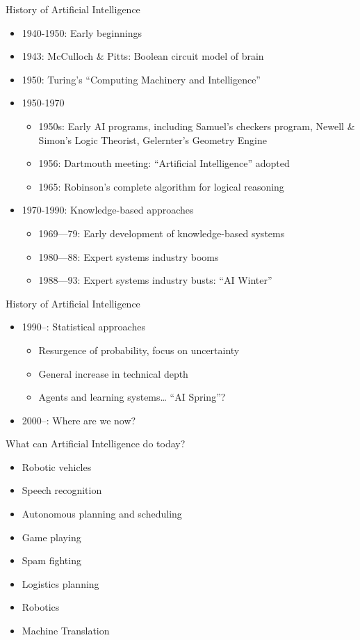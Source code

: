 \documentclass{beamer}
\begin{document}
\begin{frame}{History of Artificial Intelligence}
\begin{itemize}
    \item 1940-1950: Early beginnings
    \item 1943: McCulloch & Pitts: Boolean circuit model of brain
    \item 1950: Turing's “Computing Machinery and Intelligence”
    \item 1950-1970
    \begin{itemize}
        \item 1950s: Early AI programs, including Samuel's checkers program, Newell & Simon's Logic Theorist, Gelernter's Geometry Engine
        \item 1956: Dartmouth meeting: “Artificial Intelligence” adopted
        \item 1965: Robinson's complete algorithm for logical reasoning
    \end{itemize}
    \item 1970-1990: Knowledge-based approaches
    \begin{itemize}
        \item 1969—79: Early development of knowledge-based systems
        \item 1980—88: Expert systems industry booms
        \item 1988—93: Expert systems industry busts: “AI Winter”
    \end{itemize}
\end{itemize}
\end{frame}

\begin{frame}{History of Artificial Intelligence}
\begin{itemize}
    \item 1990--: Statistical approaches
    \begin{itemize}
        \item Resurgence of probability, focus on uncertainty
        \item General increase in technical depth
        \item Agents and learning systems… “AI Spring”?
    \end{itemize}
    \item 2000--: Where are we now?
\end{itemize}
\end{frame}

\begin{frame}{What can Artificial Intelligence do today?}
\begin{itemize}
    \item Robotic vehicles
    \item Speech recognition
    \item Autonomous planning and scheduling
    \item Game playing
    \item Spam fighting
    \item Logistics planning
    \item Robotics
    \item Machine Translation
\end{itemize}
\end{frame}
\end{document}
